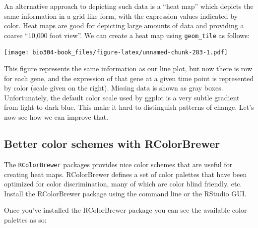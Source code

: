 \documentclass[]{book}
\newenvironment{Shaded}{\begin{snugshade}}{\end{snugshade}}
\newcommand{\DataTypeTok}[1]{\textcolor[rgb]{0.13,0.29,0.53}{#1}}
\newcommand{\KeywordTok}[1]{\textcolor[rgb]{0.13,0.29,0.53}{\textbf{#1}}}
\newcommand{\NormalTok}[1]{#1}
\newcommand{\OperatorTok}[1]{\textcolor[rgb]{0.81,0.36,0.00}{\textbf{#1}}}
\newcommand{\StringTok}[1]{\textcolor[rgb]{0.31,0.60,0.02}{#1}}
\theoremstyle{definition}
\theoremstyle{definition}
\theoremstyle{definition}
\theoremstyle{remark}
\begin{document}
An alternative approach to depicting such data is a ``heat map'' which
depicts the same information in a grid like form, with the expression
values indicated by color. Heat maps are good for depicting large
amounts of data and providing a coarse ``10,000 foot view''. We can
create a heat map using \texttt{geom\_tile} as follows:

\begin{Shaded}
\end{Shaded}

\texttt{[image: bio304-book\_files/figure-latex/unnamed-chunk-283-1.pdf]}

This figure represents the same information as our line plot, but now
there is row for each gene, and the expression of that gene at a given
time point is represented by color (scale given on the right). Missing
data is shown as gray boxes. Unfortunately, the default color scale used
by ggplot is a very subtle gradient from light to dark blue. This make
it hard to distinguish patterns of change. Let's now see how we can
improve that.

\hypertarget{better-color-schemes-with-rcolorbrewer}{%
\subsection{Better color schemes with
RColorBrewer}\label{better-color-schemes-with-rcolorbrewer}}

The \texttt{RColorBrewer} packages provides nice color schemes that are
useful for creating heat maps. RColorBrewer defines a set of color
palettes that have been optimized for color discrimination, many of
which are color blind friendly, etc. Install the RColorBrewer package
using the command line or the RStudio GUI.

Once you've installed the RColorBrewer package you can see the available
color palettes as so:
\end{document}
